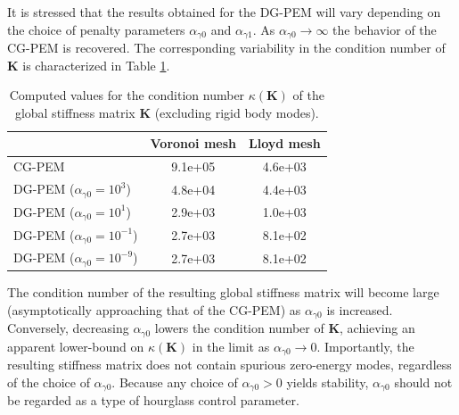 It is stressed that the results obtained for the DG-PEM will vary depending on the choice of penalty parameters $\alpha_{\gamma0}$ and $\alpha_{\gamma1}$. As $\alpha_{\gamma0} \rightarrow \infty$ the behavior of the CG-PEM is recovered. The corresponding variability in the condition number of $\mathbf{K}$ is characterized in Table \ref{tab:global_stiffness_condition_number}.
\begin{table}[!ht]
  \begin{center}
    \begin{tabular}{| l || c | c |}
    \hline
           & Voronoi mesh & Lloyd mesh \\ \hline \hline
    CG-PEM & 9.1e+05 & 4.6e+03 \\ \hline
    DG-PEM ($\alpha_{\gamma0} = 10^3$) & 4.8e+04 & 4.4e+03 \\ \hline
    DG-PEM ($\alpha_{\gamma0} = 10^1$) & 2.9e+03 & 1.0e+03 \\ \hline
    DG-PEM ($\alpha_{\gamma0} = 10^{-1}$) & 2.7e+03 & 8.1e+02  \\ \hline
    DG-PEM ($\alpha_{\gamma0} = 10^{-9}$) & 2.7e+03 & 8.1e+02 \\
    \hline
    \end{tabular}
    \caption{Computed values for the condition number $\kappa(\mathbf{K})$ of the global stiffness matrix $\mathbf{K}$ (excluding rigid body modes).}
    \vspace{-5pt}
    \label{tab:global_stiffness_condition_number}
    \vspace{-10pt}
  \end{center}
\end{table}

The condition number of the resulting global stiffness matrix will become large (asymptotically approaching that of the CG-PEM) as $\alpha_{\gamma0}$ is increased. Conversely, decreasing $\alpha_{\gamma0}$ lowers the condition number of $\mathbf{K}$, achieving an apparent lower-bound on $\kappa (\mathbf{K})$ in the limit as $\alpha_{\gamma0} \rightarrow 0$. Importantly, the resulting stiffness matrix does not contain spurious zero-energy modes, regardless of the choice of $\alpha_{\gamma0}$. Because any choice of $\alpha_{\gamma0} > 0$ yields stability, $\alpha_{\gamma0}$ should not be regarded as a type of hourglass control parameter.



